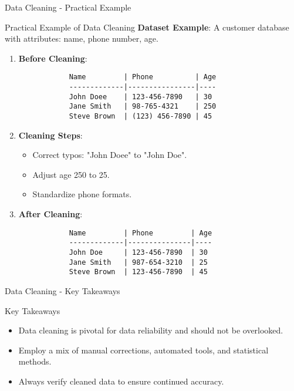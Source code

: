 \documentclass[aspectratio=169]{beamer}
\begin{document}
\begin{frame}[fragile]{Data Cleaning - Practical Example}
    \begin{block}{Practical Example of Data Cleaning}
        \textbf{Dataset Example}: A customer database with attributes: name, phone number, age.
        
        \begin{enumerate}
            \item \textbf{Before Cleaning}:
            \begin{lstlisting}
            Name         | Phone          | Age 
            -------------|----------------|----
            John Doee    | 123-456-7890   | 30 
            Jane Smith   | 98-765-4321    | 250 
            Steve Brown  | (123) 456-7890 | 45 
            \end{lstlisting}
            
            \item \textbf{Cleaning Steps}:
            \begin{itemize}
                \item Correct typos: "John Doee" to "John Doe".
                \item Adjust age 250 to 25.
                \item Standardize phone formats.
            \end{itemize}
            
            \item \textbf{After Cleaning}:
            \begin{lstlisting}
            Name         | Phone         | Age 
            -------------|---------------|----
            John Doe     | 123-456-7890  | 30 
            Jane Smith   | 987-654-3210  | 25 
            Steve Brown  | 123-456-7890  | 45 
            \end{lstlisting}
        \end{enumerate}
    \end{block}
\end{frame}

\begin{frame}[fragile]{Data Cleaning - Key Takeaways}
    \begin{block}{Key Takeaways}
        \begin{itemize}
            \item Data cleaning is pivotal for data reliability and should not be overlooked.
            \item Employ a mix of manual corrections, automated tools, and statistical methods.
            \item Always verify cleaned data to ensure continued accuracy.
        \end{itemize}
    \end{block}
\end{frame}
\end{document}
